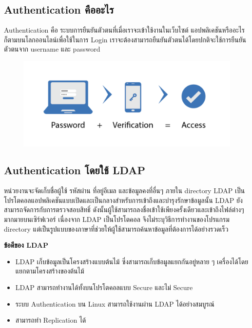 \subsection{Authentication คืออะไร}
Authentication คือ ระบบการยืนยันตัวตนที่เมื่อเราจะเข้าใช้งานในเว็บไซต์ \mbox{แอปพลิเคชัน}หรืออะไรก็ตามบนโลกออนไลน์เพื่อใช้ในการ Login
เราจะต้องสามารถยืนยันตัวตนได้โดยปกติจะใช้การยืนยันตัวตนจาก username และ password
\begin{figure}[!thb]
	\captionsetup{justification=centering}
	\centering
	\includegraphics[width=6in]{latex/figures/authen.png}
	\label{fig:authen}
\end{figure}
\newpage

\subsection{Authentication โดยใช้ LDAP }
หน่วยงานจะจัดเก็บชื่อผู้ใช้ รหัสผ่าน ที่อยู่อีเมล และข้อมูลคงที่อื่นๆ ภายใน directory LDAP เป็นโปรโตคอลแอปพลิเคชันแบบเปิดและเป็นกลางสำหรับการเข้าถึงและบำรุงรักษาข้อมูลนั้น LDAP ยังสามารถจัดการกับการตรวจสอบสิทธิ์ ดังนั้นผู้ใช้สามารถลงชื่อเข้าใช้เพียงครั้งเดียวและเข้าถึงไฟล์ต่างๆ มากมายบนเซิร์ฟเวอร์ เนื่องจาก LDAP เป็นโปรโตคอล จึงไม่ระบุวิธีการทำงานของโปรแกรม directory แต่เป็นรูปแบบของภาษาที่ช่วยให้ผู้ใช้สามารถค้นหาข้อมูลที่ต้องการได้อย่างรวดเร็ว
\begin{flushleft}
	\textbf{ข้อดีของ LDAP}
\end{flushleft}
\begin{itemize}
    \item LDAP เก็บข้อมูลเป็นโครงสร้างแบบต้นไม้ ซึ่งสามารถเก็บข้อมูลแยกกันอยู่หลาย ๆ เครื่องได้โดยแยกตามโครงสร้างของต้นไม้
    \item LDAP สามารถทำงานได้ทั้งบนโปรโตคอลแบบ Secure และไม่ Secure
    \item ระบบ Authentication บน Linux สามารถใช้งานผ่าน LDAP ได้อย่างสมบูรณ์
    \item สามารถทำ Replication ได้
\end{itemize}


